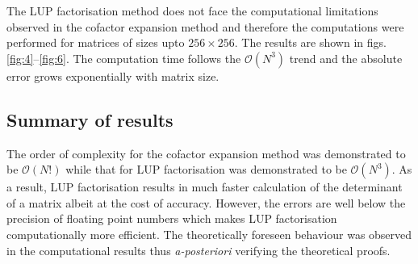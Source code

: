 \documentclass[11pt, oneside]{article}
\begin{document}
The LUP factorisation method does not face the computational limitations observed in the cofactor expansion method and therefore the computations were performed for matrices of sizes upto $256\times256$. The results are shown in figs.\ref{fig:4}--\ref{fig:6}. The computation time follows the $\mathcal{O}(N^3)$ trend and the absolute error grows exponentially with matrix size.

\subsection*{Summary of results}
The order of complexity for the cofactor expansion method was demonstrated to be $\mathcal{O}(N!)$ while that for LUP factorisation was demonstrated to be $\mathcal{O}(N^3)$. As a result, LUP factorisation results in much faster calculation of the determinant of a matrix albeit at the cost of accuracy. However, the errors are well below the precision of floating point numbers which makes LUP factorisation computationally more efficient. The theoretically foreseen behaviour was observed in the computational results thus \textit{a-posteriori} verifying the theoretical proofs.
\end{document}
